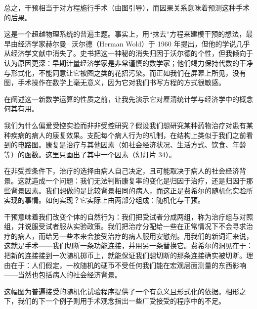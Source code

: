 总之，干预相当于对方程施行手术（由图引导），而因果关系意味着预测这种手术的后果。

这是一个超越物理系统的普遍主题。事实上，用“抹去”方程来建模干预的想法，最早由经济学家赫尔曼·沃尔德（Herman Wold）于 1960 年提出，但他的学说几乎从经济学文献中消失了。史书把这一神秘的消失归因于沃尔德的个性，但我倾向于认为原因更深：早期计量经济学家是非常谨慎的数学家；他们竭力保持代数的干净与形式化，不能同意让它被图之类的花招污染。而正如我们在屏幕上所见，没有图，手术操作在数学上毫无意义，因为它对我们书写方程的方式很敏感。

在阐述这一新数学运算的性质之前，让我先演示它对厘清统计学与经济学中的概念何其有用。

我们为什么偏爱受控实验而非非受控研究？假设我们想研究某种药物治疗对患有某种疾病的病人的康复效果。支配每个病人行为的机制，在结构上类似于我们之前看到的电路图。康复是治疗与其他因素（如社会经济状况、生活方式、饮食、年龄等）的函数。这里只画出了其中一个因素（幻灯片 34）。

\begin{center}
\end{center}

在非受控条件下，治疗的选择由病人自己决定，且可能取决于病人的社会经济背景。这就造成一个问题：我们无法判断康复率的变化是归因于治疗，还是归因于那些背景因素。我们想做的是比较背景相同的病人，而这正是费希尔的随机化实验所实现的事情。如何实现？它实际上由两部分组成：随机化与干预。

干预意味着我们改变个体的自然行为：我们把受试者分成两组，称为治疗组与对照组，并说服受试者服从实验政策。我们把治疗分配给一些在正常情况下不会寻求治疗的病人，而给另一些本来会接受治疗的病人服用安慰剂。用我们的新词汇来说，这就是手术——我们切断一条功能连接，并用另一条替换它。费希尔的洞见在于：把新的连接接到一次随机掷币上，就能保证我们想切断的那条连接确实被切断。理由在于：人们假定，一枚随机的硬币不受任何我们能在宏观层面测量的东西影响——当然也包括病人的社会经济背景。

这幅图为普遍接受的随机化试验程序提供了一个有意义且形式化的依据。相形之下，我们的下一个例子则用手术观念指出一些广受接受的程序中的不足。

